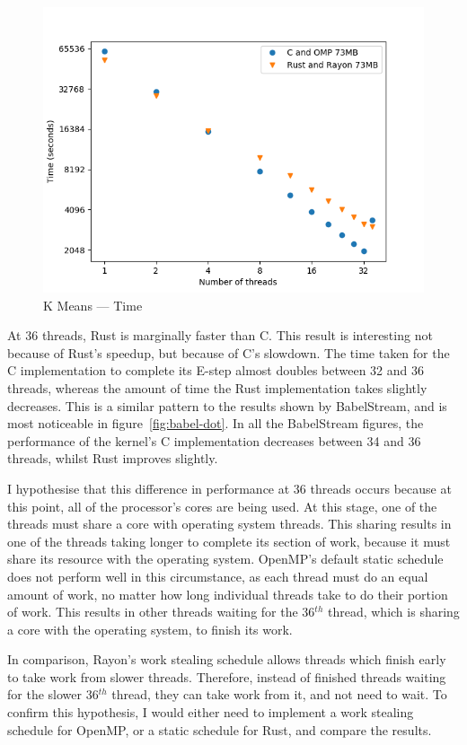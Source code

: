 \begin{figure}[h]
\centering
\includegraphics[width=.9\linewidth]{figs/kmeans/time.png}
\caption{K Means --- Time}\label{fig:kmeans-time}
\end{figure}

At 36 threads, Rust is marginally faster than C. This result is interesting not because of Rust's speedup, but because of C's slowdown. The time taken for the C implementation to complete its E-step almost doubles between 32 and 36 threads, whereas the amount of time the Rust implementation takes slightly decreases. This is a similar pattern to the results shown by BabelStream, and is most noticeable in figure~\ref{fig:babel-dot}.
In all the BabelStream figures, the performance of the kernel's C implementation decreases between 34 and 36 threads, whilst Rust improves slightly.

I hypothesise that this difference in performance at 36 threads occurs because at this point, all of the processor's cores are being used. At this stage, one of the threads must share a core with operating system threads. This sharing results in one of the threads taking longer to complete its section of work, because it must share its resource with the operating system. OpenMP's default static schedule does not perform well in this circumstance, as each thread must do an equal amount of work, no matter how long individual threads take to do their portion of work.
This results in other threads waiting for the 36$^{th}$ thread, which is sharing a core with the operating system, to finish its work.

In comparison, Rayon's work stealing schedule allows threads which finish early to take work from slower threads. Therefore, instead of finished threads waiting for the slower 36$^{th}$ thread, they can take work from it, and not need to wait. To confirm this hypothesis, I would either need to implement a work stealing schedule for OpenMP, or a static schedule for Rust, and compare the results.

